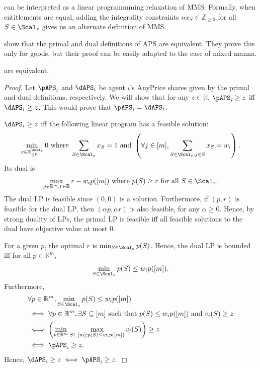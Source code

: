  can be interpreted as a linear programmming relaxation of MMS.
Formally, when entitlements are equal, adding the integrality constraints
$nx_S \in \mathbb{Z}_{\ge 0}$ for all $S \in \Scal_z$ gives us an alternate definition of MMS.

\cite{babaioff2023fair} show that the primal and dual definitions of APS are equivalent.
They prove this only for goods, but their proof can be easily adapted to the case of mixed manna.

\begin{lemma}
\label{thm:aps-primal-dual-equiv}
 are equivalent.
\end{lemma}
\begin{proof}
Let $\pAPS_i$ and $\dAPS_i$ be agent $i$'s AnyPrice shares given by
the primal and dual definitions, respectively.
We will show that for any $z \in \mathbb{R}$, $\pAPS_i \ge z$ iff $\dAPS_i \ge z$.
This would prove that $\pAPS_i = \dAPS_i$.

$\dAPS_i \ge z$ iff the following linear program has a feasible solution:
\[ \min_{x \in \mathbb{R}_{\ge 0}^{\Scal_z}} 0
\textrm{ where } \sum_{S \in \Scal_z} x_S = 1
    \textrm{ and } \left(\forall j \in [m], \sum_{S \in \Scal_z: j \in S} x_S = w_i\right). \]
Its dual is
\[ \max_{p \in \mathbb{R}^m, r \in \mathbb{R}} r - w_ip([m])
\textrm{ where } p(S) \ge r \textrm{ for all } S \in \Scal_z. \]
The dual LP is feasible since $(0, 0)$ is a solution.
Furthermore, if $(p, r)$ is feasible for the dual LP,
then $(\alpha p, \alpha r)$ is also feasible, for any $\alpha \ge 0$.
Hence, by strong duality of LPs, the primal LP is feasible iff
all feasible solutions to the dual have objective value at most 0.

For a given $p$, the optimal $r$ is $\min_{S \in \Scal_z} p(S)$.
Hence, the dual LP is bounded iff for all $p \in \mathbb{R}^m$,
\[ \min_{S \in \Scal_z} p(S) \le w_ip([m]). \]
Furthermore,
\begin{align*}
& \forall p \in \mathbb{R}^m, \min_{S \in \Scal_z} p(S) \le w_ip([m])
\\ &\iff \forall p \in \mathbb{R}^m, \exists S \subseteq [m] \textrm{ such that }
    p(S) \le w_ip([m]) \textrm{ and } v_i(S) \ge z
\\ &\iff \left(\min_{p \in \mathbb{R}^m} \max_{S \subseteq [m]: p(S) \le w_ip([m])} v_i(S)\right) \ge z
\\ &\iff \pAPS_i \ge z.
\end{align*}
Hence, $\dAPS_i \ge z \iff \pAPS_i \ge z$.
\end{proof}

